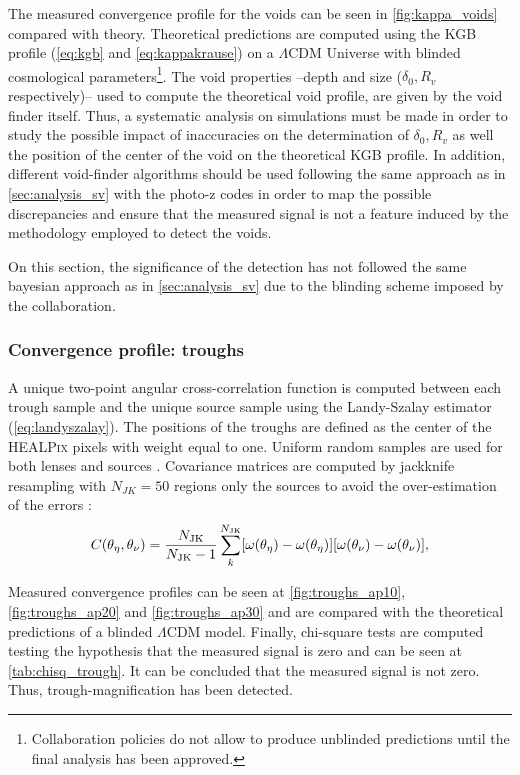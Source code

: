 The measured convergence profile for the voids can be seen in \autoref{fig:kappa_voids} compared with theory. Theoretical predictions are computed using the KGB profile (\autoref{eq:kgb} and \autoref{eq:kappakrause}) on a $\Lambda$CDM Universe with blinded cosmological parameters\footnote{Collaboration policies do not allow to produce unblinded predictions until the final analysis has been approved.}. The void properties --depth and size ($\delta_0, R_v$ respectively)-- used to compute the theoretical void profile, are given by the void finder itself. Thus, a systematic analysis on simulations must be made in order to study the possible impact of inaccuracies on the determination of $\delta_0,R_v$ as well the position of the center of the void on the theoretical KGB profile. In addition, different void-finder algorithms should be used following the same approach as in \autoref{sec:analysis_sv} with the photo-z codes in order to map the possible discrepancies and ensure that the measured signal is not a feature induced by the methodology employed to detect the voids.
\newline

On this section, the significance of the detection has not followed the same bayesian approach as in \autoref{sec:analysis_sv} due to the blinding scheme imposed by the collaboration.

\subsubsection{Convergence profile: troughs}
A unique two-point angular cross-correlation function is computed between each trough sample and the unique source sample using the Landy-Szalay estimator (\autoref{eq:landyszalay}). The positions of the troughs are defined as the center of the {\scshape HEALPix} pixels with weight equal to one. Uniform random samples are used for both lenses and sources . Covariance matrices are computed by jackknife resampling with $N_{JK}=50$ regions only the sources to avoid the over-estimation of the errors \cite{2017arXiv170307786F}:
\begin{equation}
C(\theta_\eta,\theta_\nu) = \frac{N_{\rm JK}}{N_{\rm JK}-1}\sum\limits_k^{N_{\rm JK}}[\omega(\theta_\eta)-\omega(\theta_\eta)][\omega(\theta_\nu)-\omega(\theta_\nu)],
\end{equation}
\newline

Measured convergence profiles can be seen at \autoref{fig:troughs_ap10}, \autoref{fig:troughs_ap20} and \autoref{fig:troughs_ap30} and are compared with the theoretical predictions of a blinded $\Lambda$CDM model. Finally, chi-square tests are computed testing the hypothesis that the measured signal is zero and can be seen at \autoref{tab:chisq_trough}. It can be concluded that the measured signal is not zero. Thus, trough-magnification has been detected.

